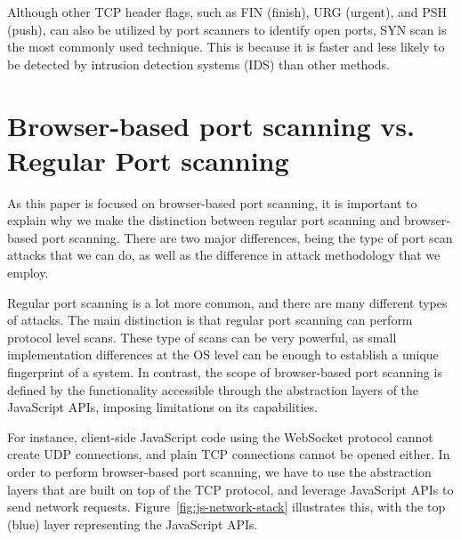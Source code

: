  Although other TCP header flags, such as FIN (finish), URG (urgent), and PSH (push), can also be utilized by port scanners to identify open ports, SYN scan is the most commonly used technique. This is because it is faster and less likely to be detected by intrusion detection systems (IDS) than other methods. 

\section{Browser-based port scanning vs. Regular Port scanning}

As this paper is focused on browser-based port scanning, it is important to explain why we make the distinction between regular port scanning and browser-based port scanning. 
There are two major differences, being the type of port scan attacks that we can do, as well as the difference in attack methodology that we employ. 

Regular port scanning is a lot more common, and there are many different types of attacks. The main distinction is that regular port scanning can perform protocol level scans. These type of scans can be very powerful, as small implementation differences at the OS level can be enough to establish a unique fingerprint of a system. In contrast, the scope of browser-based port scanning is defined by the functionality accessible through the abstraction layers of the JavaScript APIs, imposing limitations on its capabilities.

For instance, client-side JavaScript code using the WebSocket protocol cannot create UDP connections, and plain TCP connections cannot be opened either. In order to perform browser-based port scanning, we have to use the abstraction layers that are built on top of the TCP protocol, and leverage JavaScript APIs to send network requests. Figure~\ref{fig:js-network-stack} illustrates this, with the top (blue) layer representing the JavaScript APIs.

